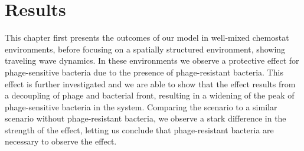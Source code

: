 \chapter{Results}
\label{chap:phages_results}

This chapter first presents the outcomes of our model in well-mixed chemostat environments, before focusing on a spatially structured environment, showing traveling wave dynamics. In these environments we observe a protective effect for phage-sensitive bacteria due to the presence of phage-resistant bacteria. This effect is further investigated and we are able to show that the effect results from a decoupling of phage and bacterial front, resulting in a widening of the peak of phage-sensitive bacteria in the system. Comparing the scenario to a similar scenario without phage-resistant bacteria, we observe a stark difference in the strength of the effect, letting us conclude that phage-resistant bacteria are necessary to observe the effect.

